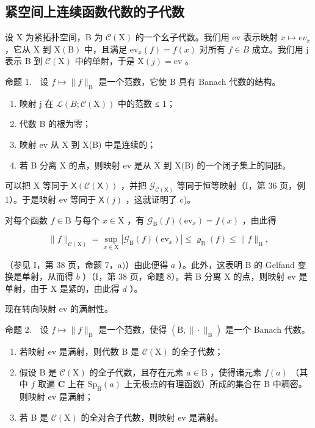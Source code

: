 \subsection{紧空间上连续函数代数的子代数}

设 X 为紧拓扑空间，B 为 \(\mathcal{C}(\mathrm{X})\) 的一个幺子代数。我们用 ev 表示映射 \(x \mapsto ev_{x}\) ，它从 X 到 \(\mathrm{X}(\mathrm{B})\) 中，且满足 \(\mathrm{ev}_{x}(f) = f(x)\) 对所有 \(f \in B\) 成立。我们用 j 表示 B 到 \(\mathcal{C}(\mathrm{X})\) 中的单射，于是 \(\mathrm{X}(j) = \mathrm{ev}\) 。

命题 1.　设 \(f \mapsto \|f\|_{\mathrm{B}}\) 是一个范数，它使 B 具有 Banach 代数的结构。

\begin{enumerate}
\def\labelenumi{\alph{enumi})}
\item
  映射 j 在 \(\mathcal{L}(B; \mathcal{C}(\mathrm{X}))\) 中的范数 ≤ 1；
\item
  代数 B 的根为零；
\item
  映射 ev 从 X 到 X(B) 中是连续的；
\item
  若 B 分离 X 的点，则映射 ev 是从 X 到 X(B) 的一个闭子集上的同胚。
\end{enumerate}

可以把 X 等同于 \(\mathsf{X}(\mathcal{C}(\mathsf{X}))\) ，并把 \(\mathcal{G}_{\mathcal{C}(\mathsf{X})}\) 等同于恒等映射（I，第 36 页，例 1）。于是映射 ev 等同于 \(\mathsf{X}(j)\) ，这就证明了 c)。

对每个函数 \(f \in \mathrm{B}\) 与每个 \(x \in \mathrm{X}\) ，有 \(\mathcal{G}_{\mathrm{B}}(f)(\mathrm{ev}_x) = f(x)\) ，由此得

\[
\| f \| _ {\mathcal {C} (\mathrm{X})} = \sup _ {x \in \mathrm{X}} | \mathcal {G} _ {\mathrm{B}} (f) (\mathrm{ev} _ {x}) | \leqslant \varrho_ {\mathrm{B}} (f) \leqslant \| f \| _ {\mathrm{B}},
\]

（参见 I，第 38 页，命题 7，a)）由此便得 \(a\) ）。此外，这表明 B 的 Gelfand 变换是单射，从而得 \(b\) ）（I，第 38 页，命题 8）。若 B 分离 X 的点，则映射 ev 是单射，由于 X 是紧的，由此得 \(d\) ）。

现在转向映射 ev 的满射性。

命题 2.　设 \(f \mapsto \|f\|_{\mathrm{B}}\) 是一个范数，使得 \((\mathrm{B}, \| \cdot \|_{\mathrm{B}})\) 是一个 Banach 代数。

\begin{enumerate}
\def\labelenumi{\alph{enumi})}
\item
  若映射 ev 是满射，则代数 B 是 \(\mathcal{C}(\mathrm{X})\) 的全子代数；
\item
  假设 B 是 \(\mathcal{C}(\mathrm{X})\) 的全子代数，且存在元素 \(a \in \mathrm{B}\) ，使得诸元素 \(f(a)\) （其中 \(f\) 取遍 \(\mathbf{C}\) 上在 \(\mathrm{Sp}_{\mathrm{B}}(a)\) 上无极点的有理函数）所成的集合在 B 中稠密。则映射 ev 是满射；
\item
  若 B 是 \(\mathcal{C}(\mathrm{X})\) 的全对合子代数，则映射 ev 是满射。
\end{enumerate}

